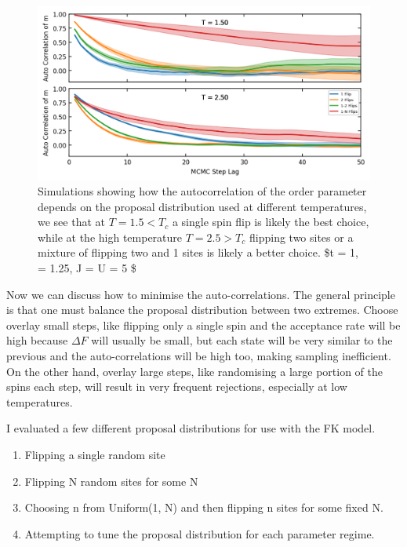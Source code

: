 \hypertarget{fig:autocorr_multiple_proposals}{%
\begin{figure}
\centering
\includegraphics[width=1\textwidth,height=\textheight]{../figure_code/fk_chapter/lsr/figs/autocorr_multiple_proposals.png}
\caption[{no title}]{Simulations showing how the autocorrelation of the order parameter depends on the proposal distribution used at different temperatures, we see that at \(T = 1.5 < T_c\) a single spin flip is likely the best choice, while at the high temperature \(T = 2.5 > T_c\) flipping two sites or a mixture of flipping two and 1 sites is likely a better choice. \$t = 1, \alpha = 1.25, J = U = 5 \$}
\label{fig:autocorr_multiple_proposals}
\end{figure}
}

Now we can discuss how to minimise the auto-correlations. The general principle is that one must balance the proposal distribution between two extremes. Choose overlay small steps, like flipping only a single spin and the acceptance rate will be high because \(\Delta F\) will usually be small, but each state will be very similar to the previous and the auto-correlations will be high too, making sampling inefficient. On the other hand, overlay large steps, like randomising a large portion of the spins each step, will result in very frequent rejections, especially at low temperatures.

I evaluated a few different proposal distributions for use with the FK model.

\begin{enumerate}
\def\labelenumi{\arabic{enumi}.}
\tightlist
\item
  Flipping a single random site
\item
  Flipping N random sites for some N
\item
  Choosing n from Uniform(1, N) and then flipping n sites for some fixed N.
\item
  Attempting to tune the proposal distribution for each parameter regime.
\end{enumerate}

